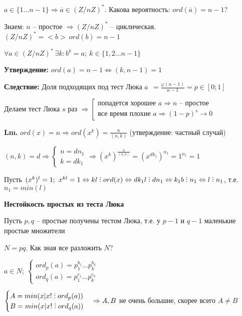 \documentclass[14pt, letter paper]{article}
\DeclareRobustCommand{\divby}{%
  \mathrel{\text{\vbox{\baselineskip.65ex\lineskiplimit0pt\hbox{.}\hbox{.}\hbox{.}}}}%
}
\begin{document}
$a \in \{1 \ldots n-1\} \Rightarrow \overline{a} \in (Z/nZ)^*$. Какова вероятность: $ord(\overline{a}) = n - 1$?

\vspace{5mm}

Знаем: $n$ -- простое $\Rightarrow (Z/nZ)^*$ -- циклическая. $(Z/nZ)^* = <b>\ ord(b) = n - 1$

$\forall a \in (Z/nZ)^*\ \exists k : b^k = a;\ k \in \{1, 2 \ldots n-1\}$

\textbf{Утверждение:} $ord(a) = n - 1 \Leftrightarrow (k, n-1) = 1$

\textbf{Следствие:} Доля подходящих под тест Люка $a\ \ = \frac{\varphi(n-1)}{n-1} = p \in [0; 1]$

Делаем тест Люка $s$ раз $\Rightarrow \left[ \begin{gathered}
    \text{попадется хорошее } a \Rightarrow n \text{ -- простое} \\
    \text{все время плохие } a \Rightarrow (1-p)^s \rightarrow 0
\end{gathered} \right.$

\textbf{Lm.} $ord(x) = n \Rightarrow ord(x^k) = \frac{n}{(n, k)}$ (утверждение: частный случай)

$(n, k) = d \Rightarrow \begin{cases}
    n = dn_1 \\
    k = dk_1
\end{cases} \Rightarrow (x^k)^\frac{n}{(n,k)} = (x^{dk_1})^{n_1} = 1^{n_1} = 1$

Пусть $(x^k)^l = 1;\ x^{kl} = 1 \Leftrightarrow kl \divby ord(x) \Leftrightarrow dk_1l \divby dn_1 \Leftrightarrow k_1b \divby n_1 \Leftrightarrow l \divby n_1$, т.е. $n_1 = min(l)$

\vspace{5mm}

\textbf{Нестойкость простых из теста Люка}

Пусть $p, q$ -- простые получены тестом Люка, т.е. у $p - 1$ и $q - 1$ маленькие простые множители

$N = pq$. Как зная все разложить $N$?

$a \in N;\ \begin{cases}
    ord_p(a) = p_1^{b_1}\ldots p_k^{b_k} \\
    ord_q(a) = p_1^{c_1}\ldots p_k^{c_k}
\end{cases}$

$\begin{cases}
    A = min(x | x! \divby ord_p(a)) \\
    B = min(x | x! \divby ord_q(a))
\end{cases} \Rightarrow A, B$ не очень большие, скорее всего $A \neq B$
\end{document}
